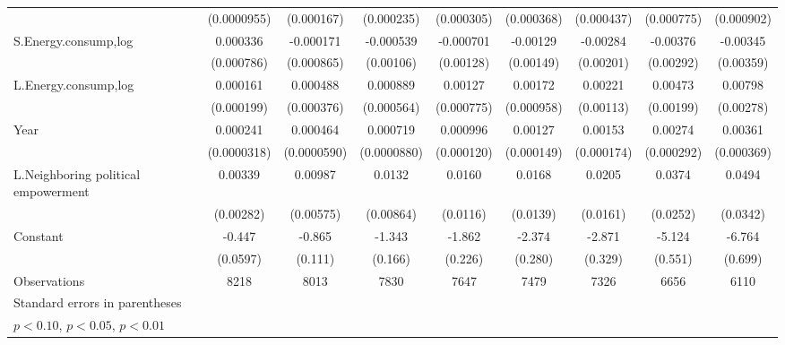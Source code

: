 \begin{table}[htbp]
\begin{tabular}{l*{8}{c}}
                    & (0.0000955)         &  (0.000167)         &  (0.000235)         &  (0.000305)         &  (0.000368)         &  (0.000437)         &  (0.000775)         &  (0.000902)         \\
[1em]
S.Energy.consump,log&    0.000336         &   -0.000171         &   -0.000539         &   -0.000701         &    -0.00129         &    -0.00284         &    -0.00376         &    -0.00345         \\
                    &  (0.000786)         &  (0.000865)         &   (0.00106)         &   (0.00128)         &   (0.00149)         &   (0.00201)         &   (0.00292)         &   (0.00359)         \\
[1em]
L.Energy.consump,log&    0.000161         &    0.000488         &    0.000889         &     0.00127         &     0.00172\sym{*}  &     0.00221\sym{*}  &     0.00473\sym{**} &     0.00798\sym{***}\\
                    &  (0.000199)         &  (0.000376)         &  (0.000564)         &  (0.000775)         &  (0.000958)         &   (0.00113)         &   (0.00199)         &   (0.00278)         \\
[1em]
Year                &    0.000241\sym{***}&    0.000464\sym{***}&    0.000719\sym{***}&    0.000996\sym{***}&     0.00127\sym{***}&     0.00153\sym{***}&     0.00274\sym{***}&     0.00361\sym{***}\\
                    & (0.0000318)         & (0.0000590)         & (0.0000880)         &  (0.000120)         &  (0.000149)         &  (0.000174)         &  (0.000292)         &  (0.000369)         \\
[1em]
L.Neighboring political empowerment&     0.00339         &     0.00987\sym{*}  &      0.0132         &      0.0160         &      0.0168         &      0.0205         &      0.0374         &      0.0494         \\
                    &   (0.00282)         &   (0.00575)         &   (0.00864)         &    (0.0116)         &    (0.0139)         &    (0.0161)         &    (0.0252)         &    (0.0342)         \\
[1em]
Constant            &      -0.447\sym{***}&      -0.865\sym{***}&      -1.343\sym{***}&      -1.862\sym{***}&      -2.374\sym{***}&      -2.871\sym{***}&      -5.124\sym{***}&      -6.764\sym{***}\\
                    &    (0.0597)         &     (0.111)         &     (0.166)         &     (0.226)         &     (0.280)         &     (0.329)         &     (0.551)         &     (0.699)         \\
\hline
Observations        &        8218         &        8013         &        7830         &        7647         &        7479         &        7326         &        6656         &        6110         \\
\hline\hline
\multicolumn{9}{l}{\footnotesize Standard errors in parentheses}\\
\multicolumn{9}{l}{\footnotesize \sym{*} \(p<0.10\), \sym{**} \(p<0.05\), \sym{***} \(p<0.01\)}\\
\end{tabular}
\end{table}
